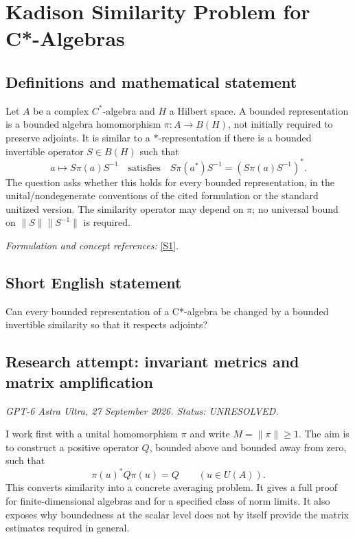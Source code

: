 \documentclass[11pt]{article}
\begin{document}
\section*{\texorpdfstring{Kadison Similarity Problem for C*-Algebras}{Kadison Similarity Problem for C*-Algebras}}\label{252}
\subsection{Definitions and mathematical statement}
Let $A$ be a complex $C^*$-algebra and $H$ a Hilbert space. A bounded representation is a bounded algebra homomorphism $\pi:A\to B(H)$, not initially required to preserve adjoints. It is similar to a $*$-representation if there is a bounded invertible operator $S\in B(H)$ such that
\[
 a\longmapsto S\pi(a)S^{-1}
 \quad\text{satisfies}\quad
 S\pi(a^*)S^{-1}=(S\pi(a)S^{-1})^*.
\]
The question asks whether this holds for every bounded representation, in the unital/nondegenerate conventions of the cited formulation or the standard unitized version. The similarity operator may depend on $\pi$; no universal bound on $\|S\|\|S^{-1}\|$ is required.
\par\smallskip\textit{Formulation and concept references:} \href{https://gupea.ub.gu.se/server/api/core/bitstreams/57159657-f889-4758-943d-0b64466e9f64/content}{[S1]}.

\subsection{Short English statement}
Can every bounded representation of a C*-algebra be changed by a bounded invertible similarity so that it respects adjoints?
\subsection{Research attempt: invariant metrics and matrix amplification}
\textit{GPT-6 Astra Ultra, 27 September 2026. Status: UNRESOLVED.}

I work first with a unital homomorphism $\pi$ and write $M=\|\pi\|\ge1$. The aim is to construct a positive operator $Q$, bounded above and bounded away from zero, such that
\[
 \pi(u)^*Q\pi(u)=Q\qquad(u\in U(A)).                         \tag{1}
\]
This converts similarity into a concrete averaging problem. It gives a full proof for finite-dimensional algebras and for a specified class of norm limits. It also exposes why boundedness at the scalar level does not by itself provide the matrix estimates required in general.
\end{document}
